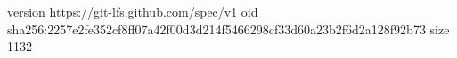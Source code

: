 version https://git-lfs.github.com/spec/v1
oid sha256:2257e2fe352cf8ff07a42f00d3d214f5466298cf33d60a23b2f6d2a128f92b73
size 1132
